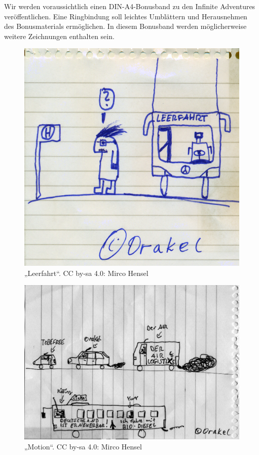Wir werden voraussichtlich einen DIN-A4-Bonusband zu den Infinite Adventures veröffentlichen. Eine Ringbindung soll leichtes Umblättern und Herausnehmen des Bonusmaterials ermöglichen. In diesem Bonusband werden möglicherweise weitere Zeichnungen enthalten sein.

\begin{figure}[p]
    \includegraphics[width=\linewidth]{z-include-main-oleerfahrt.png}
    \caption{„Leerfahrt“. CC by-sa 4.0: Mirco Hensel}
\end{figure}

\begin{figure}[p]
    \includegraphics[width=\linewidth]{z-include-main-omotion.png}
    \caption{„Motion“. CC by-sa 4.0: Mirco Hensel}
\end{figure}


